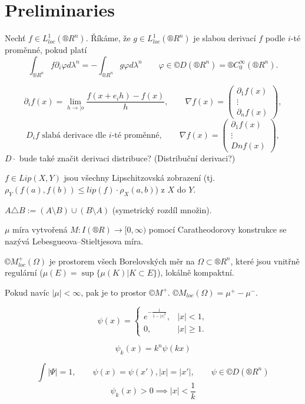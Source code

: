\documentclass[12pt]{article}					%
\begin{document}

\section{Preliminaries}
\begin{definice}
	Nechť $f \in L^1_{loc}(®R^n)$. Říkáme, že $g \in L^1_{loc}(®R^n)$ je slabou derivací $f$ podle $i$-té proměnné, pokud platí
	$$ \int_{®R^n} f \partial_i φ dλ^n = - \int_{®R^n} g φ dλ^n \qquad φ \in ©D(®R^n) = ®C^∞_0(®R^n). $$
\end{definice}

\begin{definice}[Značení]
	$$ \partial_i f(x) = \lim_{h \rightarrow ¦o} \frac{f(x + e_i h) - f(x)}{h}, \qquad \nabla f(x) = \begin{pmatrix} \partial_1f(x) \\ \vdots\\ \partial_n f(x) \end{pmatrix}, $$
	$$ D_if \text{ slabá derivace dle $i$-té proměnné}, \qquad \nabla f(x) = \begin{pmatrix} \partial_1f(x) \\ \vdots\\ Dn f(x) \end{pmatrix}, $$
	$D·$ bude také značit derivaci distribuce? (Distribuční derivaci?)

	$f \in Lip(X, Y)$ jsou všechny Lipschitzovská zobrazení (tj. $ρ_Y(f(a), f(b)) ≤ lip(f)·ρ_X(a, b)$) z $X$ do $Y$.

	$A \triangle B := (A \setminus B) \cup (B \setminus A)$ (symetrický rozdíl množin).
\end{definice}

\begin{definice}
	$μ$ míra vytvořená $M: I(®R) \rightarrow [0, ∞)$ pomocí Caratheodorovy konstrukce se nazývá Lebesgueova–Stieltjesova míra.
\end{definice}

\begin{definice}
	$©M^+_{loc}(Ω)$ je prostorem všech Borelovských měr na $Ω \subset ®R^n$, které jsou vnitřně regulární ($μ(E) = \sup\{\mu(K) | K \subset E\}$), lokálně kompaktní.

	Pokud navíc $|μ| < ∞$, pak je to prostor $©M^+$. $©M_{loc}(Ω) = μ^+ - μ^-$.
\end{definice}

\begin{definice}[?]
	$$ ψ(x) = \begin{cases}e^{-\frac{1}{1 - |x|^2}}, & |x| < 1,\\ 0, & |x| ≥ 1.\end{cases} $$

	$$ ψ_k(x) = k^n ψ(kx) $$

	\begin{poznamkain}
		$$\int |Ψ| = 1, \qquad ψ(x) = ψ(x'), |x| = |x'|, \qquad ψ \in ©D(®R^n) $$
		$$ ψ_k(x) > 0 \implies |x| < \frac{1}{k} $$
	\end{poznamkain}
\end{definice}
\end{document}
